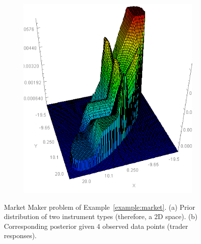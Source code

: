 \documentclass[letterpaper]{article}
\begin{document}
\begin{figure}
\begin{subfigure}{.24\textwidth}
  \caption{}
  \label{fig:mmm.prior}
\end{subfigure}%
\begin{subfigure}{.24\textwidth}
  \centering
  \includegraphics[width=.80\textwidth]{pic/MM2.png}
  \caption{}
  \label{fig:mmm.posterior}
\end{subfigure}
\vspace{-1mm}
\caption{\footnotesize 
Market Maker problem of Example~\ref{example:market}.
(a) Prior distribution of two instrument types (therefore, a 2D space). 
(b) Corresponding posterior given 4 observed data points (trader responses).}
\label{fig:mmm}
\end{figure}
\end{document}
